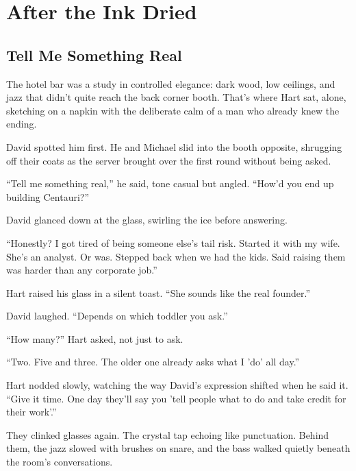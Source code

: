 \section{After the Ink Dried}

\subsection{Tell Me Something Real}

The hotel bar was a study in controlled elegance: dark wood, low ceilings, and jazz that didn’t 
quite reach the back corner booth.
That’s where Hart sat, alone, sketching on a napkin with the deliberate calm of a man who already knew 
the ending.

David spotted him first.
He and Michael slid into the booth opposite, shrugging off their coats as the server brought over the 
first round without being asked.

``Tell me something real,'' he said, tone casual but angled. ``How’d you end up building Centauri?''

David glanced down at the glass, swirling the ice before answering.

``Honestly? I got tired of being someone else’s tail risk. Started it with my wife. She’s an analyst. 
Or was. Stepped back when we had the kids. Said raising them was harder than any corporate job.''

Hart raised his glass in a silent toast. ``She sounds like the real founder.''

David laughed. ``Depends on which toddler you ask.''

``How many?'' Hart asked, not just to ask.

``Two. Five and three. The older one already asks what I 'do' all day.''

Hart nodded slowly, watching the way David’s expression shifted when he said it.
``Give it time. One day they’ll say you 'tell people what to do and take credit for their work'.''

They clinked glasses again. The crystal tap echoing like punctuation. Behind them, the jazz slowed with 
brushes on snare, and the bass walked quietly beneath the room’s conversations.

\medskip

